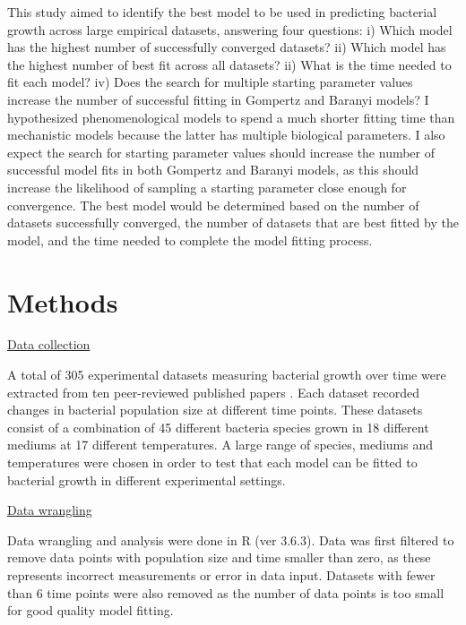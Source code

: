 \documentclass[11pt]{article}
\begin{document}
This study aimed to identify the best model to be used in predicting bacterial growth across large empirical datasets, answering four questions: i) Which model has the highest number of successfully converged datasets? ii) Which model has the highest number of best fit across all datasets? ii) What is the time needed to fit each model? iv) Does the search for multiple starting parameter values increase the number of successful fitting in Gompertz and Baranyi models? I hypothesized phenomenological models to spend a much shorter fitting time than mechanistic models because the latter has multiple biological parameters. I also expect the search for starting parameter values should increase the number of successful model fits in both Gompertz and Baranyi models, as this should increase the likelihood of sampling a starting parameter close enough for convergence. The best model would be determined based on the number of datasets successfully converged, the number of datasets that are best fitted by the model, and the time needed to complete the model fitting process.



\section{Methods}

\underline{Data collection} 

A total of 305 experimental datasets measuring bacterial growth over time were extracted from ten peer-reviewed published papers \cite{roth_continuity_1962, stannard_temperaturegrowth_1985, phillips_relation_1987, sivonen_effects_1990, zwietering_modeling_1990, gill_growth_1991, bae_growth_2014, galarz_predicting_2016, bernhardt_metabolic_2018, silva_modelling_2018}. Each dataset recorded changes in bacterial population size at different time points. These datasets consist of a combination of 45 different bacteria species grown in 18 different mediums at 17 different temperatures. A large range of species, mediums and temperatures were chosen in order to test that each model can be fitted to bacterial growth in different experimental settings. 
\vspace{\baselineskip}

\underline{Data wrangling}

Data wrangling and analysis were done in R (ver 3.6.3). Data was first filtered to remove data points with population size and time smaller than zero, as these represents incorrect measurements or error in data input. Datasets with fewer than 6 time points were also removed as the number of data points is too small for good quality model fitting. 
\vspace{\baselineskip}
\end{document}
